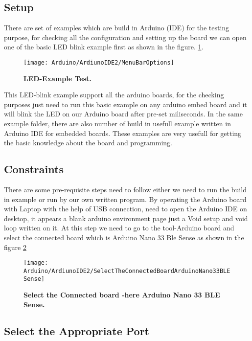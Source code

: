 \subsection{Setup}

There are set of examples which are build in Arduino (IDE) for the testing purpose, for checking all the configuration and setting up the board we can open one of the basic LED blink example first as shown in the figure.  \ref{fig:LED-Example Test}.



\begin{figure}[H]\centering
    \texttt{[image: Arduino/ArdiunoIDE2/MenuBarOptions]}
    \caption{\textbf{LED-Example Test.}}
    \label{fig:LED-Example Test}		
\end{figure}

This LED-blink example support all the arduino boards, for the checking purposes just need to run this basic example on any arduino embed board and it will blink the LED on our Arduino board after pre-set miliseconds. In the same example folder, there are also number of build in usefull example written in Arduino IDE for embedded boards. These examples are very usefull for getting the basic knowledge about the board and programming.

\subsection{Constraints}

There are some pre-requisite steps need to follow either we need to run the build in example or run by our own written program. By operating the Arduino board with Laptop with the help of USB connection, need to open the Arduino IDE on desktop, it appears a blank arduino environment page just a Void setup and void loop written on it. At this step we need to go to the tool-Arduino board and select the connected board which is Arduino Nano 33 Ble Sense as shown in the figure   \ref{fig:Select the Connected board -here Arduino Nano 33 BLE Sense}

\begin{figure}[H]\centering
    \texttt{[image: Arduino/ArdiunoIDE2/SelectTheConnectedBoardArduinoNano33BLESense]}
    \caption{\textbf{Select the Connected board -here Arduino Nano 33 BLE Sense.}}
    \label{fig:Select the Connected board -here Arduino Nano 33 BLE Sense}		
\end{figure}

\subsection{Select the Appropriate Port}

